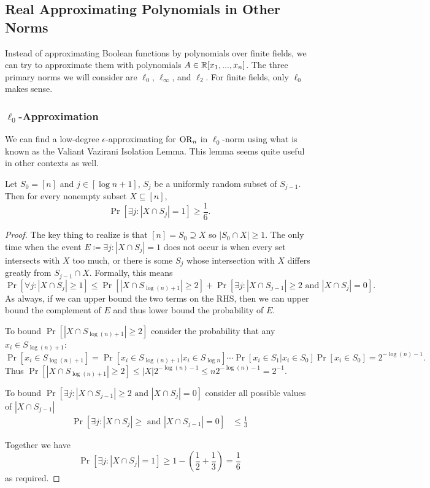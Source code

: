 \documentclass[11pt]{article}
\begin{document}
	\subsection{Real Approximating Polynomials in Other Norms}
	Instead of approximating Boolean functions by polynomials over finite fields, we can try to approximate them with polynomials $A \in \mathbb{R}[x_1, ..., x_n]$. The three primary norms we will consider are $\ell_{0}$, $\ell_{\infty}$, and $\ell_{2}$. For finite fields, only $\ell_{0}$ makes sense.
	
	\subsubsection{\texorpdfstring{$\ell_{0}$}{l0}-Approximation}
	We can find a low-degree $\epsilon$-approximating for $\mathrm{OR}_n$ in $\ell_0$-norm using what is known as the Valiant Vazirani Isolation Lemma. This lemma seems quite useful in other contexts as well.
	\begin{lemma}
		\label{lem:ValVazIsolationLemma}
		Let $S_0 = [n]$ and $j \in [\log n + 1]$, $S_j$ be a uniformly random subset of $S_{j-1}$. Then for every nonempty subset $X \subseteq [n]$,
		\[\Pr[\exists j: |X \cap S_j| = 1] \geq \frac{1}{6}.\]
	\end{lemma} 
	\begin{proof}
		The key thing to realize is that $[n] = S_0 \supseteq X$ so $|S_0 \cap X| \geq 1$. The only time when the event $E \coloneqq \exists j: |X \cap S_j| = 1$ does not occur is when every set intersects with $X$ too much, or there is some $S_j$ whose intersection with $X$ differs greatly from $S_{j-1} \cap X$. Formally, this means 
		\[\Pr[\forall j: |X \cap S_j| \geq 1] \leq \Pr[|X\cap S_{\log(n) + 1}| \geq 2] + \Pr[\exists j: |X \cap S_{j-1}| \geq 2 \mbox{ and } |X\cap S_j| = 0].\]
		As always, if we can upper bound the two terms on the RHS, then we can upper bound the complement of $E$ and thus lower bound the probability of $E$. 
		
		To bound $\Pr[|X \cap S_{\log(n) + 1}| \geq 2]$ consider the probability that any $x_i \in S_{\log(n) + 1}$:
		\[\Pr[x_i \in S_{\log(n) + 1}] = \Pr[x_i \in S_{\log(n) + 1}|x_i \in S_{\log n}]\cdots\Pr[x_i \in S_1| x_i \in S_0]\Pr[x_i \in S_0] = 2^{-\log(n) - 1}.\]
		Thus $\Pr[|X \cap S_{\log(n) + 1}| \geq 2] \leq |X|2^{-\log(n) - 1} \leq n2^{-\log(n) - 1} = 2^{-1}$.
		
		To bound $\Pr[\exists j: |X \cap S_{j-1}| \geq 2 \mbox{ and } |X\cap S_j| = 0]$ consider all possible values of $|X \cap S_{j-1}|$
		\begin{align*}
			\Pr[\exists j: |X\cap S_j| \geq \mbox{ and } |X\cap S_{j-1}| = 0] &\leq \frac{1}{3}
		\end{align*}
	
		Together we have 
		\[\Pr[\exists j: |X \cap S_j| = 1] \geq 1 - \left(\frac{1}{2} + \frac{1}{3}\right) = \frac{1}{6}\]
		as required.
	\end{proof}
\end{document}
